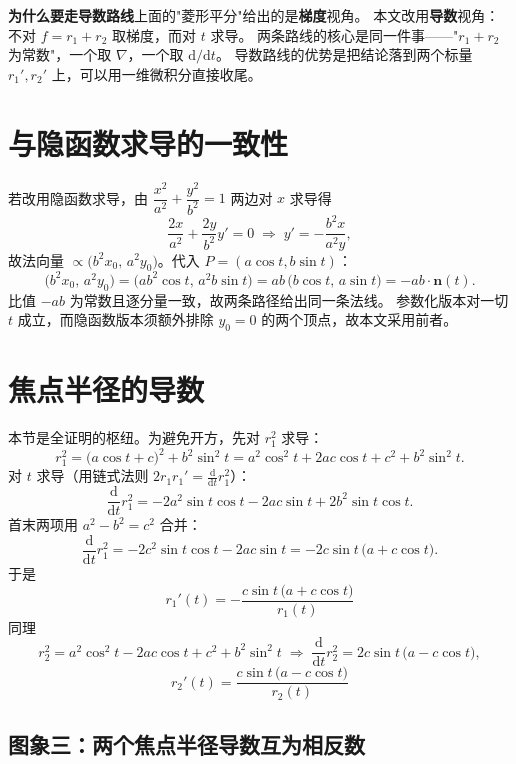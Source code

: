 \documentclass[11pt]{ctexart}
\begin{document}
\begin{cmpbox}
\textbf{为什么要走导数路线}\quad 上面的"菱形平分"给出的是\textbf{梯度}视角。
本文改用\textbf{导数}视角：不对 $f=r_{1}+r_{2}$ 取梯度，而对 $t$ 求导。
两条路线的核心是同一件事——"$r_{1}+r_{2}$ 为常数"，一个取 $\nabla$，一个取 $\mathrm{d}/\mathrm{d}t$。
导数路线的优势是把结论落到两个标量 $r_{1}',r_{2}'$ 上，可以用一维微积分直接收尾。
\end{cmpbox}

\section{与隐函数求导的一致性}

若改用隐函数求导，由 $\dfrac{x^{2}}{a^{2}}+\dfrac{y^{2}}{b^{2}}=1$ 两边对 $x$ 求导得
\[
\frac{2x}{a^{2}}+\frac{2y}{b^{2}}y'=0
\;\Longrightarrow\;
y'=-\frac{b^{2}x}{a^{2}y},
\]
故法向量 $\propto\bigl(b^{2}x_{0},\,a^{2}y_{0}\bigr)$。代入 $P=(a\cos t,b\sin t)$：
\[
\bigl(b^{2}x_{0},\,a^{2}y_{0}\bigr)
=\bigl(ab^{2}\cos t,\,a^{2}b\sin t\bigr)
=ab\,\bigl(b\cos t,\,a\sin t\bigr)
=-ab\cdot\mathbf{n}(t).
\]
比值 $-ab$ 为常数且逐分量一致，故两条路径给出同一条法线。
参数化版本对一切 $t$ 成立，而隐函数版本须额外排除 $y_{0}=0$ 的两个顶点，故本文采用前者。

\section{焦点半径的导数}

本节是全证明的枢纽。为避免开方，先对 $r_{1}^{2}$ 求导：
\[
r_{1}^{2}=\bigl(a\cos t+c\bigr)^{2}+b^{2}\sin^{2}t
=a^{2}\cos^{2}t+2ac\cos t+c^{2}+b^{2}\sin^{2}t .
\]
对 $t$ 求导（用链式法则 $2r_{1}r_{1}'=\frac{\mathrm{d}}{\mathrm{d}t}r_{1}^{2}$）：
\[
\frac{\mathrm{d}}{\mathrm{d}t}r_{1}^{2}
=-2a^{2}\sin t\cos t-2ac\sin t+2b^{2}\sin t\cos t .
\]
首末两项用 $a^{2}-b^{2}=c^{2}$ 合并：
\[
\frac{\mathrm{d}}{\mathrm{d}t}r_{1}^{2}
=-2c^{2}\sin t\cos t-2ac\sin t
=-2c\sin t\,\bigl(a+c\cos t\bigr).
\]
于是
\[
\boxed{\;
r_{1}'(t)=-\frac{c\sin t\,\bigl(a+c\cos t\bigr)}{r_{1}(t)}
\;}
\]
同理
\[
r_{2}^{2}=a^{2}\cos^{2}t-2ac\cos t+c^{2}+b^{2}\sin^{2}t
\;\Longrightarrow\;
\frac{\mathrm{d}}{\mathrm{d}t}r_{2}^{2}=2c\sin t\,\bigl(a-c\cos t\bigr),
\]
\[
\boxed{\;
r_{2}'(t)=\frac{c\sin t\,\bigl(a-c\cos t\bigr)}{r_{2}(t)}
\;}
\]

\subsection{图象三：两个焦点半径导数互为相反数}
\end{document}
